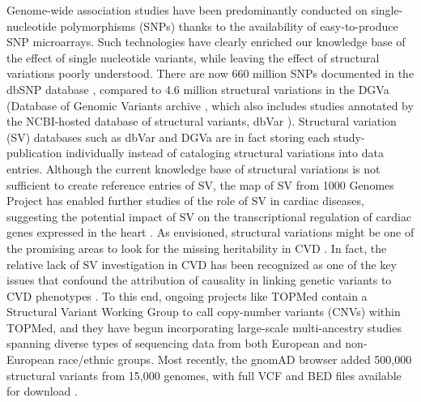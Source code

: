 \documentclass[letter]{bib}
\begin{document}
	
	Genome-wide association studies have been predominantly conducted on single-nucleotide polymorphisms (SNPs) thanks to the availability of easy-to-produce SNP microarrays. Such technologies have clearly enriched our knowledge base of the effect of single nucleotide variants, while leaving the effect of structural variations poorly understood. There are now 660 million SNPs documented in the dbSNP database \citep{NCBI:2018:dbSNP}, compared to 4.6 million structural variations in the DGVa (Database of Genomic Variants archive \citep{EMBL-EBI:2018:Database}, which also includes studies annotated by the NCBI-hosted database of structural variants, dbVar \citep{NCBI:2018:dbVar}).  Structural variation (SV) databases such as dbVar and DGVa are in fact storing each study-publication individually instead of cataloging structural variations into data entries. Although the current knowledge base of structural variations is not sufficient to create reference entries of SV, the map of SV from 1000 Genomes Project \citep{Sudmant:2015:integrated} has enabled further studies of the role of SV in cardiac diseases, suggesting the potential impact of SV on the transcriptional regulation of cardiac genes expressed in the heart \citep{Haas:2018:Genomic}. As envisioned, structural variations might be one of the promising areas to look for the missing heritability in CVD \citep{Eichler:2010:Missing}.  In fact, the relative lack of SV investigation in CVD has been recognized as one of the key issues that confound the attribution of causality in linking genetic variants to CVD phenotypes \citep{Macrae:2017:Closing}.  To this end, ongoing projects like TOPMed contain a Structural Variant Working Group to call copy-number variants (CNVs) within TOPMed, and they have begun incorporating large-scale multi-ancestry studies spanning diverse types of sequencing data from both European and non-European race/ethnic groups.  Most recently, the gnomAD browser \citep{Lek:2016:Analysis} added 500,000 structural variants from 15,000 genomes, with full VCF and BED files available for download \citep{Collins:2019:Open}.  
	
\end{document}
